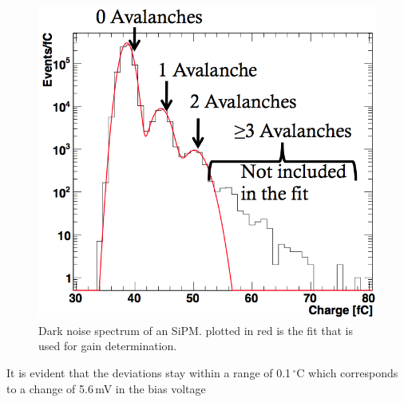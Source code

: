\begin{figure}[h]
\begin{minipage}[t]{0.455\textwidth}
\includegraphics[width=\textwidth]{Figures/kuensken/gainDetermination.png}
\caption{Dark noise spectrum of an SiPM. plotted in red is the fit that is used for gain determination.}
\label{kuenskendarkNoise}
\end{minipage}
\end{figure}
It is evident that the deviations stay within a range of 0.1\,$^\circ$C which corresponds to a change of 5.6\,mV in the bias voltage

